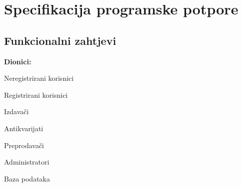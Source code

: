 \chapter{Specifikacija programske potpore}
		
	\section{Funkcionalni zahtjevi}
			
			
			\noindent \textbf{Dionici:}
			\begin{packed_enum}
				\item Neregistrirani korisnici
				\item Registrirani korisnici
					\begin{packed_enum}
						\item Izdavači
						\item Antikvarijati
						\item Preprodavači
					\end{packed_enum}
				\item Administratori
				\item Baza podataka
			\end{packed_enum}
			
